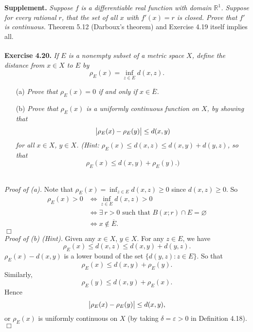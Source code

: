 \documentclass{article}
\begin{document}
\textbf{Supplement.}
\emph{Suppose $f$ is a differentiable real function with domain $\mathbb{R}^1$.
Suppose for every rational $r$,
that the set of all $x$ with $f'(x)=r$ is closed.
Prove that $f'$ is continuous.}
Theorem 5.12 (Darboux's theorem) and Exercise 4.19 itself implies all.
\\\\






\textbf{Exercise 4.20.}
\emph{If $E$ is a nonempty subset of a metric space $X$,
define the distance from $x \in X$ to $E$ by
\[
  \rho_E(x) = \inf_{z \in E} d(x,z).
\]}
\begin{enumerate}
  \item[(a)]
  \emph{Prove that $\rho_E(x) = 0$ if and only if $x \in \overline{E}$.}

  \item[(b)]
  \emph{Prove that $\rho_E(x)$ is a uniformly continuous function on $X$,
  by showing that
  \[
    \abs{ \rho_E(x) - \rho_E(y) } \leq d(x,y)
  \]
  for all $x \in X$, $y \in X$.
  (Hint: $\rho_E(x) \leq d(x,z) \leq d(x,y) + d(y,z)$, so that
  \[
    \rho_E(x) \leq d(x,y) + \rho_E(y).)
  \]} \\
\end{enumerate}

\emph{Proof of (a).}
Note that $\rho_E(x) = \inf_{z \in E} d(x,z) \geq 0$ since $d(x,z) \geq 0$.
So
\begin{align*}
  \rho_E(x) > 0
  &\Longleftrightarrow
  \inf_{z \in E} d(x,z) > 0 \\
  &\Longleftrightarrow
  \exists \: r > 0 \text{ such that } B(x;r) \cap E = \varnothing \\
  &\Longleftrightarrow
  x \not\in \overline{E}.
\end{align*}
$\Box$ \\

\emph{Proof of (b) (Hint).}
Given any $x \in X$, $y \in X$.
For any $z \in E$, we have
\[
  \rho_E(x) \leq d(x,z) \leq d(x,y) + d(y,z).
\]
$\rho_E(x) - d(x,y)$ is a lower bound of the set $\{ d(y,z) : z \in E \}$.
So that
\[
  \rho_E(x) \leq d(x,y) + \rho_E(y).
\]
Similarly,
\[
  \rho_E(y) \leq d(x,y) + \rho_E(x).
\]
Hence
\[
  \abs{ \rho_E(x) - \rho_E(y) } \leq d(x,y),
\]
or $\rho_E(x)$ is uniformly continuous on $X$
(by taking $\delta = \varepsilon > 0$ in Definition 4.18).
$\Box$ \\\\
\end{document}

